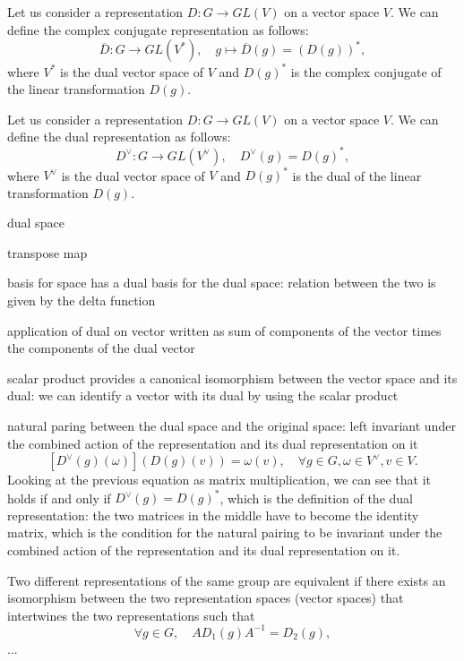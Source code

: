 \begin{definition}
    Let us consider a representation \(D : G \to GL(V)\) on a vector space \(V\). We can define the complex conjugate representation as follows:
    \[
        \overline{D} : G \to GL(V^*), \quad g \mapsto \overline{D}(g) = (D(g))^*,
    \]
    where \(V^*\) is the dual vector space of \(V\) and \(D(g)^*\) is the complex conjugate of the linear transformation \(D(g)\).
\end{definition}

\begin{definition}
    Let us consider a representation \(D : G \to GL(V)\) on a vector space \(V\). We can define the dual representation as follows:
    \[
        D^\vee  : G \to GL(V^\vee), \quad D^\vee(g) = D(g)^*,
    \]
    where \(V^\vee\) is the dual vector space of \(V\) and \(D(g)^*\) is the dual of the linear transformation \(D(g)\).
\end{definition}

dual space

transpose map

basis for space has a dual basis for the dual space: relation between the two is given by the delta function

application of dual on vector written as sum of components of the vector times the components of the dual vector

scalar product provides a canonical isomorphism between the vector space and its dual: we can identify a vector with its dual by using the scalar product

natural paring between the dual space and the original space: left invariant under the combined action of the representation and its dual representation on it
\[
    [D^{\vee} (g)(\omega)](D(g)(v)) = \omega(v), \quad \forall g \in G, \omega \in V^\vee, v \in V.
\]
Looking at the previous equation as matrix multiplication, we can see that it holds if and only if \(D^\vee(g) = D(g)^*\), which is the definition of the dual representation: the two matrices in the middle have to become the identity matrix, which is the condition for the natural pairing to be invariant under the combined action of the representation and its dual representation on it.

\begin{definition}
    Two different representations of the same group are equivalent if there exists an isomorphism between the two representation spaces (vector spaces) that intertwines the two representations such that
    \[
        \forall g \in G, \quad A D_1(g) A^{-1} = D_2(g),
    \]
    ...
\end{definition}

